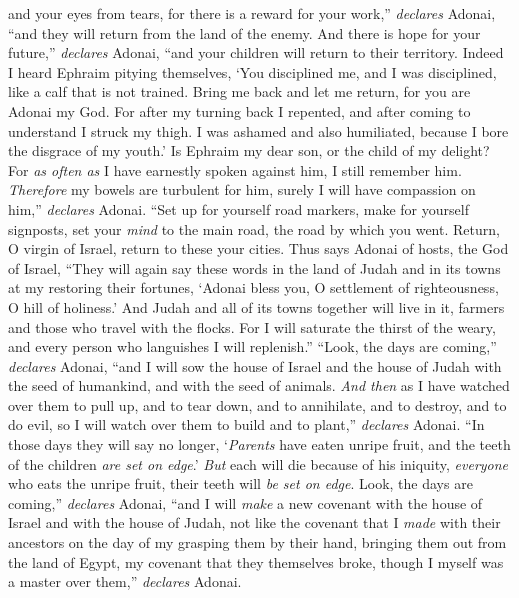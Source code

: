 \begin{biblechapter}
and your eyes from tears, 
for there is a reward for your work,” \textit{declares} Adonai, 
“and they will return from the land of the enemy.
\verse And there is hope for your future,” \textit{declares} Adonai, 
“and your children will return to their territory.
\verse Indeed I heard Ephraim pitying themselves, 
‘You disciplined me, and I was disciplined, 
like a calf that is not trained. 
Bring me back and let me return, 
for you are Adonai my God.
\verse For after my turning back I repented, 
and after coming to understand I struck my thigh. 
I was ashamed and also humiliated, 
because I bore the disgrace of my youth.’
\verse Is Ephraim my dear son, 
or the child of my delight? 
For \textit{as often as} I have earnestly spoken against him, 
I still remember him. 
\textit{Therefore} my bowels are turbulent for him, 
surely I will have compassion on him,” \textit{declares} Adonai.
\verse “Set up for yourself road markers, 
make for yourself signposts, 
set your \textit{mind} to the main road, 
the road by which you went. 
Return, O virgin of Israel, 
return to these your cities.
\verse Thus says Adonai of hosts, the God of Israel, “They will again say these words in the land of Judah and in its towns at my restoring their fortunes,
\verse ‘Adonai bless you, O settlement of righteousness, 
O hill of holiness.’
\verse And Judah and all of its towns together will live in it, 
farmers and those who travel with the flocks.
\verse For I will saturate the thirst of the weary, 
and every person who languishes I will replenish.”
 “Look, the days are coming,” \textit{declares} Adonai, “and I will sow the house of Israel and the house of Judah with the seed of humankind, and with the seed of animals.
\verse \textit{And then} as I have watched over them to pull up, and to tear down, and to annihilate, and to destroy, and to do evil, so I will watch over them to build and to plant,” \textit{declares} Adonai.
\verse “In those days they will say no longer, ‘\textit{Parents} have eaten unripe fruit, and the teeth of the children \textit{are set on edge}.’
\verse \textit{But} each will die because of his iniquity, \textit{everyone} who eats the unripe fruit, their teeth will \textit{be set on edge}.
\verse Look, the days are coming,” \textit{declares} Adonai, “and I will \textit{make} a new covenant with the house of Israel and with the house of Judah,
\verse not like the covenant that I \textit{made} with their ancestors on the day of my grasping them by their hand, bringing them out from the land of Egypt, my covenant that they themselves broke, though I myself was a master over them,” \textit{declares} Adonai.

\end{biblechapter}
